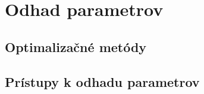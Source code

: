 \section{Odhad parametrov}
\subsection{Optimalizačné metódy}
\subsection{Prístupy k odhadu parametrov}


